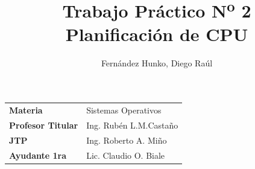 \documentclass[a4paper]{article}
\title{\Huge{Trabajo Pr\'actico N\textsuperscript{o} 2\\ Planif\mbox{}icaci\'on de CPU}}
\author{\Large{Fern\'andez Hunko, Diego Ra\'ul}}
\begin{document}
\maketitle
{}

\begin{tabular}{l l}
\textbf{\large{Materia}} & \large{Sistemas Operativos} \\
\textbf{\large{Profesor Titular}} & \large{Ing. Rub\'en L.M.Casta\~no} \\      
\textbf{\large{JTP}} & \large{Ing. Roberto A. Mi\~no} \\
\textbf{\large{Ayudante 1ra}} & \large{Lic. Claudio O. Biale} \\
\end{tabular}

\newpage
\end{document}
